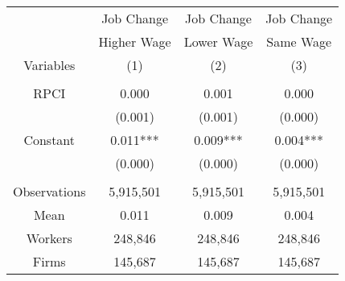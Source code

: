 \begin{tabular}{c|ccc}
\toprule
\toprule
      & Job Change & Job Change & Job Change \\
      & Higher Wage & Lower Wage & Same Wage \\
Variables & (1)   & (2)   & (3) \\
\midrule
      &       &       &  \\
RPCI  & 0.000 & 0.001 & 0.000 \\
      & (0.001) & (0.001) & (0.000) \\
Constant & \multicolumn{1}{p{6.25em}}{0.011***} & \multicolumn{1}{p{6.25em}}{0.009***} & \multicolumn{1}{p{6.25em}}{0.004***} \\
      & (0.000) & (0.000) & (0.000) \\
      &       &       &  \\
\midrule
Observations & 5,915,501 & 5,915,501 & 5,915,501 \\
Mean  & 0.011 & 0.009 & 0.004 \\
Workers & 248,846 & 248,846 & 248,846 \\
Firms & 145,687 & 145,687 & 145,687 \\
\bottomrule
\bottomrule
\end{tabular}%
